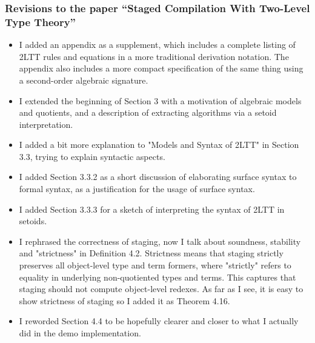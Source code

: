 \documentclass[12pt]{article}
\begin{document}

\subsubsection*{Revisions to the paper ``Staged Compilation With Two-Level Type Theory''}
\vspace{1em}

\begin{itemize}
\item
  I added an appendix as a supplement, which includes a complete listing of 2LTT
  rules and equations in a more traditional derivation notation. The appendix
  also includes a more compact specification of the same thing using a
  second-order algebraic signature.
\item
  I extended the beginning of Section 3 with a motivation of algebraic models and quotients, and      a description of extracting algorithms via a setoid interpretation.
\item
  I added a bit more explanation to "Models and Syntax of 2LTT" in Section 3.3,
  trying to explain syntactic aspects.
\item
  I added Section 3.3.2 as a short discussion of elaborating surface syntax to formal syntax,
  as a justification for the usage of surface syntax.
\item
  I added Section 3.3.3 for a sketch of interpreting the syntax of 2LTT in setoids.
\item I rephrased the correctness of staging, now I talk about soundness,
  stability and "strictness" in Definition 4.2. Strictness means that staging
  strictly preserves all object-level type and term formers, where "strictly"
  refers to equality in underlying non-quotiented types and terms. This captures
  that staging should not compute object-level redexes. As far as I see, it is
  easy to show strictness of staging so I added it as Theorem 4.16.
\item
  I reworded Section 4.4 to be hopefully clearer and closer to what I actually
  did in the demo implementation.
\end{itemize}


\end{document}

